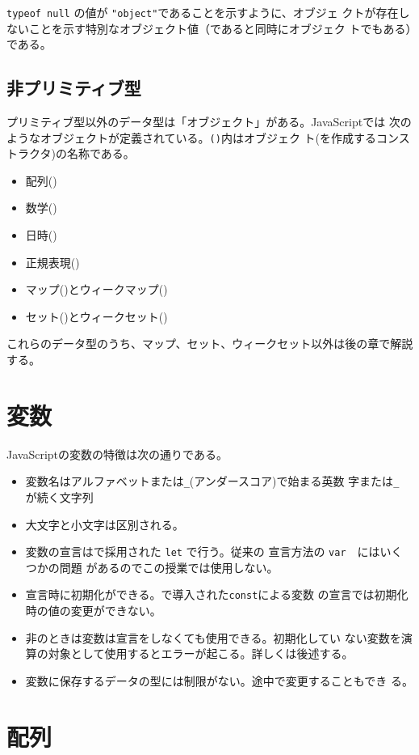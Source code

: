 \Verb+typeof null+ の値が \Verb+"object"+であることを示すように、オブジェ
クトが存在しないことを示す特別なオブジェクト値（であると同時にオブジェク
トでもある）である。
\subsection{非プリミティブ型}
プリミティブ型以外のデータ型は「オブジェクト」がある。JavaScriptでは
次のようなオブジェクトが定義されている。\texttt{()}内はオブジェク
ト(を作成するコンストラクタ)の名称である。
\begin{itemize}
 \item 配列()
 \item 数学()
 \item 日時()
 \item 正規表現()
 \item マップ()とウィークマップ()
 \item セット()とウィークセット()
\end{itemize}
これらのデータ型のうち、マップ、セット、ウィークセット以外は後の章で解説する。 
\section{変数}
JavaScriptの変数の特徴は次の通りである。
\begin{itemize}
 \item 変数名はアルファベットまたは\Verb+_+(アンダースコア)で始まる英数
       字または\Verb+_+ が続く文字列
 \item 大文字と小文字は区別される。
 \item 変数の宣言は\ES で採用された \texttt{let} で行う。従来の
       宣言方法の \texttt{var}　にはいくつかの問題
       があるのでこの授業では使用しない。
 \item 宣言時に初期化ができる。\ES で導入された\texttt{const}による変数
       の宣言では初期化時の値の変更ができない。
 \item 非\Strict のときは変数は宣言をしなくても使用できる。初期化してい
       ない変数を演算の対象として使用するとエラーが起こる。詳しくは後述する。
 \item 変数に保存するデータの型には制限がない。途中で変更することもでき
       る。
\end{itemize}
\section{配列}
